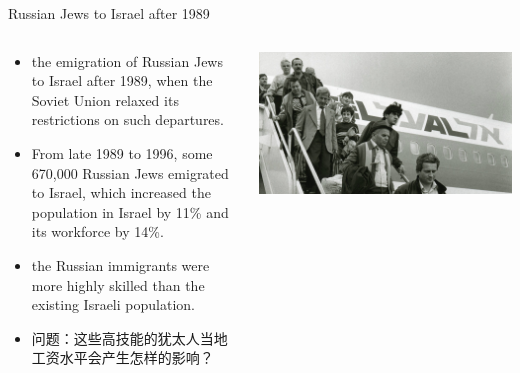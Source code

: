 \documentclass[10pt,hyperref={CJKbookmarks=true},xcolor=dvipsnames,aspectratio=169]{beamer}
\begin{document}
\begin{frame}{ Russian Jews to Israel after 1989}

\begin{columns}[onlytextwidth]
	\begin{column}{0.4\textwidth}
		\begin{itemize}
			\item  the emigration of Russian Jews to Israel after 1989, when the Soviet Union relaxed its restrictions on such departures. 
			\item From late 1989 to 1996, some 670,000 Russian Jews
			emigrated to Israel, which increased the population in Israel by 11\% and its workforce by 14\%. 
			\item the Russian immigrants were more highly skilled than the existing Israeli population.
			\item 问题：这些高技能的犹太人当地工资水平会产生怎样的影响？
		\end{itemize}
	\end{column}
	\begin{column}{0.6\textwidth}
		\includegraphics[width=\columnwidth]{fig/migration/israel}
	\end{column}
\end{columns}

\end{frame}
\end{document}
